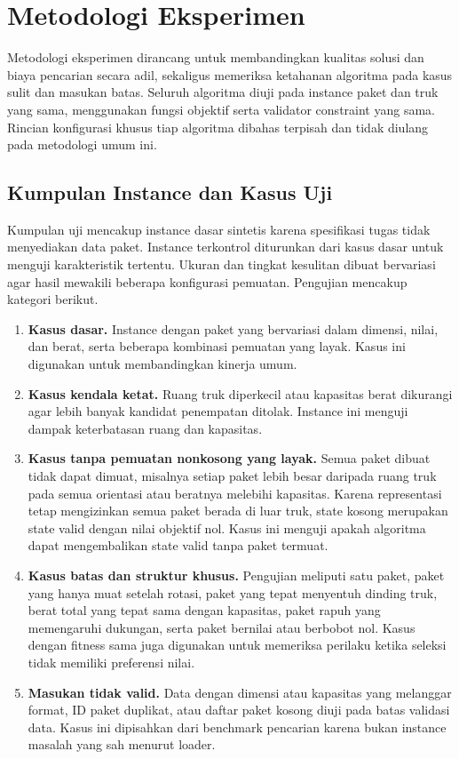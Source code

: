 \section{Metodologi Eksperimen}

Metodologi eksperimen dirancang untuk membandingkan kualitas solusi dan biaya pencarian secara adil, sekaligus memeriksa ketahanan algoritma pada kasus sulit dan masukan batas. Seluruh algoritma diuji pada instance paket dan truk yang sama, menggunakan fungsi objektif serta validator constraint yang sama. Rincian konfigurasi khusus tiap algoritma dibahas terpisah dan tidak diulang pada metodologi umum ini.

\subsection{Kumpulan Instance dan Kasus Uji}

Kumpulan uji mencakup instance dasar sintetis karena spesifikasi tugas tidak menyediakan data paket. Instance terkontrol diturunkan dari kasus dasar untuk menguji karakteristik tertentu. Ukuran dan tingkat kesulitan dibuat bervariasi agar hasil mewakili beberapa konfigurasi pemuatan. Pengujian mencakup kategori berikut.

\begin{enumerate}
    \renewcommand{\labelenumi}{(\arabic{enumi})}
    \item \textbf{Kasus dasar.} Instance dengan paket yang bervariasi dalam dimensi, nilai, dan berat, serta beberapa kombinasi pemuatan yang layak. Kasus ini digunakan untuk membandingkan kinerja umum.
    \item \textbf{Kasus kendala ketat.} Ruang truk diperkecil atau kapasitas berat dikurangi agar lebih banyak kandidat penempatan ditolak. Instance ini menguji dampak keterbatasan ruang dan kapasitas.
    \item \textbf{Kasus tanpa pemuatan nonkosong yang layak.} Semua paket dibuat tidak dapat dimuat, misalnya setiap paket lebih besar daripada ruang truk pada semua orientasi atau beratnya melebihi kapasitas. Karena representasi tetap mengizinkan semua paket berada di luar truk, state kosong merupakan state valid dengan nilai objektif nol. Kasus ini menguji apakah algoritma dapat mengembalikan state valid tanpa paket termuat.
    \item \textbf{Kasus batas dan struktur khusus.} Pengujian meliputi satu paket, paket yang hanya muat setelah rotasi, paket yang tepat menyentuh dinding truk, berat total yang tepat sama dengan kapasitas, paket rapuh yang memengaruhi dukungan, serta paket bernilai atau berbobot nol. Kasus dengan fitness sama juga digunakan untuk memeriksa perilaku ketika seleksi tidak memiliki preferensi nilai.
    \item \textbf{Masukan tidak valid.} Data dengan dimensi atau kapasitas yang melanggar format, ID paket duplikat, atau daftar paket kosong diuji pada batas validasi data. Kasus ini dipisahkan dari benchmark pencarian karena bukan instance masalah yang sah menurut loader.
\end{enumerate}

